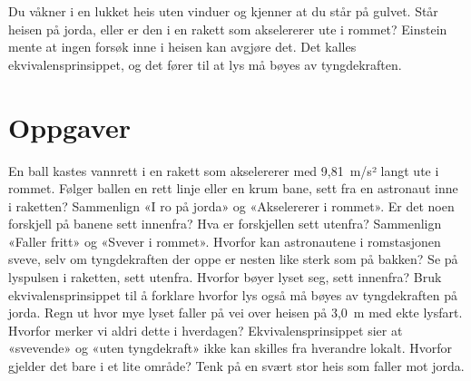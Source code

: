 \documentclass[11pt]{article}
\begin{document}

Du våkner i en lukket heis uten vinduer og kjenner at du står på gulvet. Står heisen på jorda, eller er den i en rakett som akselererer ute i rommet? Einstein mente at ingen forsøk inne i heisen kan avgjøre det. Det kalles ekvivalensprinsippet, og det fører til at lys må bøyes av tyngdekraften.

\section*{Oppgaver}

\begin{oppgaveliste}
\oppgave {}En ball kastes vannrett i en rakett som akselererer med 9,81~m/s² langt ute i rommet. Følger ballen en rett linje eller en krum bane, sett fra en astronaut inne i raketten?
\svar
\oppgave {}Sammenlign «I ro på jorda» og «Akselererer i rommet». Er det noen forskjell på banene sett innenfra? Hva er forskjellen sett utenfra?
\svar
\oppgave {}Sammenlign «Faller fritt» og «Svever i rommet». Hvorfor kan astronautene i romstasjonen sveve, selv om tyngdekraften der oppe er nesten like sterk som på bakken?
\svar
\oppgave {}Se på lyspulsen i raketten, sett utenfra. Hvorfor bøyer lyset seg, sett innenfra? Bruk ekvivalensprinsippet til å forklare hvorfor lys også må bøyes av tyngdekraften på jorda.
\svar
\oppgave {}Regn ut hvor mye lyset faller på vei over heisen på 3,0~m med ekte lysfart. Hvorfor merker vi aldri dette i hverdagen?
\svar
\oppgave {}Ekvivalensprinsippet sier at «svevende» og «uten tyngdekraft» ikke kan skilles fra hverandre lokalt. Hvorfor gjelder det bare i et lite område? Tenk på en svært stor heis som faller mot jorda.
\svar
\end{oppgaveliste}
\end{document}
